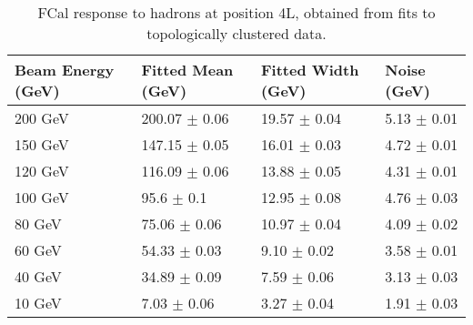 \begin{table}
\begin{center}
\begin{tabular}[!htb]{|l|l|l|l|}
\hline
Beam Energy (GeV) & Fitted Mean (GeV)& Fitted Width (GeV)& Noise (GeV) \\
\hline
200 GeV  &  200.07 $\pm$    0.06 &   19.57 $\pm$    0.04 &    5.13 $\pm$    0.01 \\
150 GeV  &  147.15 $\pm$    0.05 &   16.01 $\pm$    0.03 &    4.72 $\pm$    0.01 \\
120 GeV  &  116.09 $\pm$    0.06 &   13.88 $\pm$    0.05 &    4.31 $\pm$    0.01 \\
100 GeV  &   95.6 $\pm$    0.1 &   12.95 $\pm$    0.08 &    4.76 $\pm$    0.03 \\
 80 GeV  &   75.06 $\pm$    0.06 &   10.97 $\pm$    0.04 &    4.09 $\pm$    0.02 \\
 60 GeV  &   54.33 $\pm$    0.03 &    9.10 $\pm$    0.02 &    3.58 $\pm$    0.01 \\
 40 GeV  &   34.89 $\pm$    0.09 &    7.59 $\pm$    0.06 &    3.13 $\pm$    0.03 \\
 10 GeV  &    7.03 $\pm$    0.06 &    3.27 $\pm$    0.04 &    1.91 $\pm$    0.03 \\
\hline
\end{tabular}
\caption[4L Response to hadrons, topoclusters]{FCal response to hadrons at position 4L, obtained from fits to topologically clustered data.}
\label{table_hadron_response_t420_4L}
\end{center}
\end{table}


